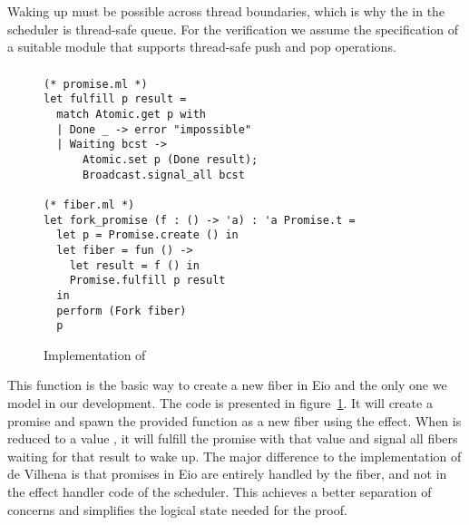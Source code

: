Waking up must be possible across thread boundaries, which is why the  in the scheduler is thread-safe queue.
For the verification we assume the specification of a suitable  module that supports thread-safe push and pop operations.


\subsubsection{}
\label{sec:sched-impl-fork}

\begin{figure}[ht]
  \begin{verbatim}
(* promise.ml *)
let fulfill p result =
  match Atomic.get p with
  | Done _ -> error "impossible"
  | Waiting bcst ->
      Atomic.set p (Done result);
      Broadcast.signal_all bcst
  
(* fiber.ml *)
let fork_promise (f : () -> 'a) : 'a Promise.t =
  let p = Promise.create () in
  let fiber = fun () ->
    let result = f () in
    Promise.fulfill p result
  in
  perform (Fork fiber) 
  p
  \end{verbatim}
  \caption{Implementation of }
  \label{fig:sched-impl-fork}
\end{figure}


This function is the basic way to create a new fiber in Eio and the only one we model in our development.
The code is presented in figure~\ref{fig:sched-impl-fork}.
It will create a promise and spawn the provided function as a new fiber using the \efork{} effect.
When  is reduced to a value , it will fulfill the promise with that value and signal all fibers waiting for that result to wake up.
The major difference to the implementation of de Vilhena is that promises in Eio are entirely handled by the fiber, and not in the effect handler code of the scheduler.
This achieves a better separation of concerns and simplifies the logical state needed for the proof.

\subsubsection{}
\label{sec:sched-impl-await}

